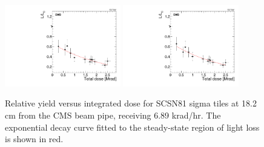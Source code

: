 \begin{figure}[tbp!]
\centering
\includegraphics[width=0.45\textwidth]{figures/SCSN81-S-18p2cm-f5ch0-dose.pdf}
\includegraphics[width=0.45\textwidth]{figures/SCSN81-S-18p2cm-f20ch5-dose.pdf}
\caption{Relative yield versus integrated dose for SCSN81 sigma tiles at 18.2 cm from the CMS beam pipe, receiving 6.89 krad/hr. The exponential decay curve fitted to the steady-state region of light loss is shown in red.}
\label{fig:SCSN81-S-18p2cm-dose}
\end{figure} 

